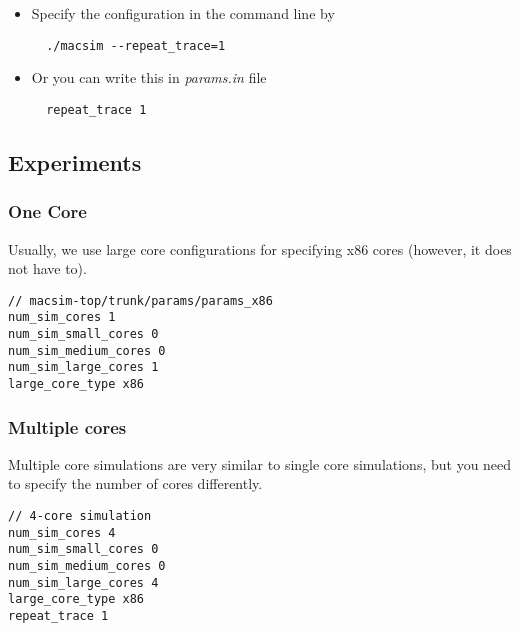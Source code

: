 \begin{itemize}
  \item Specify the configuration in the command line by
  \begin{Verbatim}
  ./macsim --repeat_trace=1
  \end{Verbatim}

  \item Or you can write this in \textit{params.in} file
  \begin{Verbatim}
  repeat_trace 1
  \end{Verbatim}
\end{itemize}




\subsection{\cpu Experiments}


\subsubsection{One \cpu Core}

Usually, we use large core configurations for specifying x86 cores
(however, it does not have to).

\begin{Verbatim}
// macsim-top/trunk/params/params_x86
num_sim_cores 1
num_sim_small_cores 0
num_sim_medium_cores 0
num_sim_large_cores 1
large_core_type x86
\end{Verbatim}


\subsubsection{Multiple \cpu cores}

Multiple core simulations are very similar to single core simulations,
but you need to specify the number of cores differently.


\begin{Verbatim}
// 4-core simulation
num_sim_cores 4
num_sim_small_cores 0
num_sim_medium_cores 0
num_sim_large_cores 4
large_core_type x86
repeat_trace 1
\end{Verbatim}


